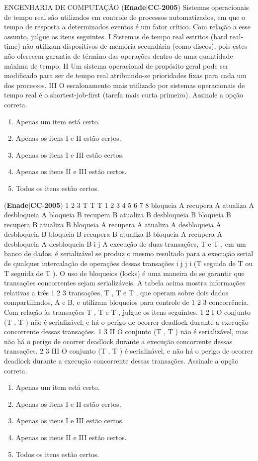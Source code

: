 \documentclass{exam}
\begin{document}
\begin{questions}
ENGENHARIA DE COMPUTAÇÃO
\question (\textbf{Enade}$|$\textbf{CC}-\textbf{2005}) Sistemas operacionais de tempo real são utilizados em controle
de processos automatizados, em que o tempo de resposta a
determinados eventos é um fator crítico. Com relação a esse
assunto, julgue os itens seguintes.
I Sistemas de tempo real estritos (hard real-time) não utilizam
dispositivos de memória secundária (como discos), pois estes
não oferecem garantia de término das operações dentro de
uma quantidade máxima de tempo.
II Um sistema operacional de propósito geral pode ser
modificado para ser de tempo real atribuindo-se prioridades
fixas para cada um dos processos.
III O escalonamento mais utilizado por sistemas operacionais de
tempo real é o shortest-job-first (tarefa mais curta primeiro).
Assinale a opção correta.
	\begin{enumerate}[label=\alph*)]
		\item  Apenas um item está certo.
		\item  Apenas os itens I e II estão certos.
		\item  Apenas os itens I e III estão certos.
		\item  Apenas os itens II e III estão certos.
		\item  Todos os itens estão certos.

	\end{enumerate}

\question (\textbf{Enade}$|$\textbf{CC}-\textbf{2005}) 1 2 3
T T T
1
2
3
4
5
6
7
8
bloqueia A
recupera A
atualiza A
desbloqueia A
bloqueia B
recupera B
atualiza B
desbloqueia B
bloqueia B
recupera B
atualiza B
bloqueia A
recupera A
atualiza A
desbloqueia A
desbloqueia B
bloqueia B
recupera B
atualiza B
bloqueia A
recupera A
desbloqueia A
desbloqueia B
i j
A execução de duas transações, T e T , em um banco de dados,
é serializável se produz o mesmo resultado para a execução serial
de qualquer intercalação de operações dessas transações
i j j i
(T seguida de T ou T seguida de T ). O uso de bloqueios (locks)
é uma maneira de se garantir que transações concorrentes sejam
serializáveis. A tabela acima mostra informações relativas a três
1 2 3
transações, T , T e T , que operam sobre dois dados
compartilhados, A e B, e utilizam bloqueios para controle de
1 2 3
concorrência. Com relação às transações T , T e T , julgue os
itens seguintes.
1 2
I O conjunto (T , T ) não é serializável, e há o perigo de
ocorrer deadlock durante a execução concorrente dessas
transações.
1 3
II O conjunto (T , T ) não é serializável, mas não há o perigo de
ocorrer deadlock durante a execução concorrente dessas
transações.
2 3
III O conjunto (T , T ) é serializável, e não há o perigo de
ocorrer deadlock durante a execução concorrente dessas
transações.
Assinale a opção correta.
	\begin{enumerate}[label=\alph*)]
		\item  Apenas um item está certo.
		\item  Apenas os itens I e II estão certos.
		\item  Apenas os itens I e III estão certos.
		\item  Apenas os itens II e III estão certos.
		\item  Todos os itens estão certos.


\end{enumerate}
\end{questions}
\end{document}
